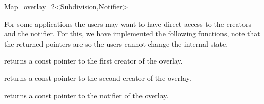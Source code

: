 \begin{ccRefClass}{Map_overlay_2<Subdivision,Notifier>}
\begin{ccAdvanced}
    For some applications the users may want to have direct access to
    the creators and the notifier. For this, we have implemented the 
    following functions, note that the returned pointers are  so
    the users cannot change the internal state.

    {returns a const pointer to the first creator of the overlay.}

    {returns a const pointer to the second creator of the overlay.}

    {returns a const pointer to the notifier of the overlay.}
    
\end{ccAdvanced}

\ccSeeAlso
{}\\

\end{ccRefClass}

\ccRefPageEnd
